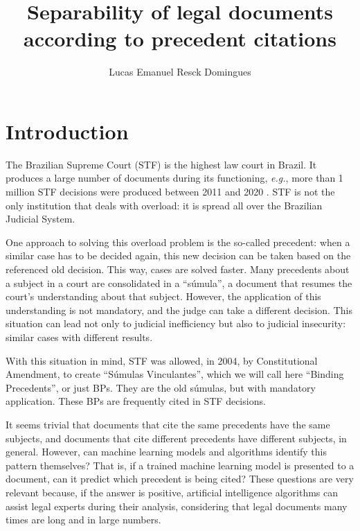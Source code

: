 \documentclass[twocolumn]{article}
\title{Separability of legal documents according to precedent citations}
\author{Lucas Emanuel Resck Domingues}
\begin{document}

      \section{Introduction}

            The Brazilian Supreme Court (STF) is the highest law court in Brazil. It produces a large number of documents during its functioning, \textit{e.g.}, more than 1 million STF decisions were produced between 2011 and 2020 \cite{stf}. STF is not the only institution that deals with overload: it is spread all over the Brazilian Judicial System.

            One approach to solving this overload problem is the so-called precedent: when a similar case has to be decided again, this new decision can be taken based on the referenced old decision. This way, cases are solved faster. Many precedents about a subject in a court are consolidated in a ``súmula'', a document that resumes the court's understanding about that subject. However, the application of this understanding is not mandatory, and the judge can take a different decision. This situation can lead not only to judicial inefficiency but also to judicial insecurity: similar cases with different results.
            
            With this situation in mind, STF was allowed, in 2004, by Constitutional Amendment, to create ``Súmulas Vinculantes'', which we will call here ``Binding Precedents'', or just BPs. They are the old súmulas, but with mandatory application. These BPs are frequently cited in STF decisions.
            
            It seems trivial that documents that cite the same precedents have the same subjects, and documents that cite different precedents have different subjects, in general. However, can machine learning models and algorithms identify this pattern themselves? That is, if a trained machine learning model is presented to a document, can it predict which precedent is being cited? These questions are very relevant because, if the answer is positive, artificial intelligence algorithms can assist legal experts during their analysis, considering that legal documents many times are long and in large numbers.
            
\end{document}
